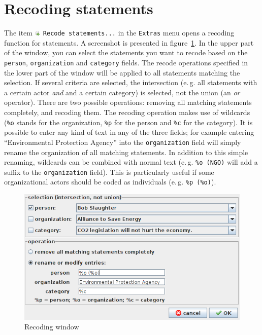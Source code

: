 \documentclass[12pt,a4paper]{scrreprt}
\newcommand{\code}[1]{\texttt{#1}}
\begin{document}
\section{Recoding statements}\label{recode}
The item \code{\includegraphics[height=9px]{icons-recode.png} Recode statements...} in the \code{Extras} menu opens a recoding function for statements. A screenshot is presented in figure~\ref{dna-recode}. In the upper part of the window, you can select the statements you want to recode based on the \code{person}, \code{organization} and \code{category} fields. The recode operations specified in the lower part of the window will be applied to all statements matching the selection. If several criteria are selected, the intersection (e.\,g. all statements with a certain actor \emph{and} and a certain category) is selected, not the union (an \emph{or} operator). There are two possible operations: removing all matching statements completely, and recoding them. The recoding operation makes use of wildcards (\code{\%o} stands for the organization, \code{\%p} for the person and \code{\%c} for the category). It is possible to enter any kind of text in any of the three fields; for example entering ``Environmental Protection Agency'' into the \code{organization} field will simply rename the organization of all matching statements. In addition to this simple renaming, wildcards can be combined with normal text (e.\,g. \code{\%o (NGO)} will add a suffix to the \code{organization} field). This is particularly useful if some organizational actors should be coded as individuals (e.\,g. \code{\%p (\%o)}).
\begin{figure}
 \centering
 \includegraphics[scale=0.4]{dna-recode.png}
 \caption{Recoding window}
 \label{dna-recode}
\end{figure}
\end{document}
